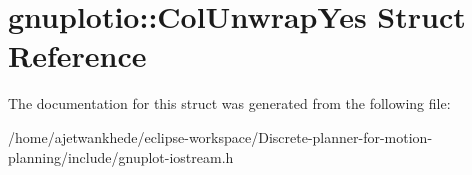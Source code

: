 \hypertarget{structgnuplotio_1_1ColUnwrapYes}{}\section{gnuplotio\+:\+:Col\+Unwrap\+Yes Struct Reference}
\label{structgnuplotio_1_1ColUnwrapYes}


The documentation for this struct was generated from the following file\+:\begin{DoxyCompactItemize}
\item 
/home/ajetwankhede/eclipse-\/workspace/\+Discrete-\/planner-\/for-\/motion-\/planning/include/gnuplot-\/iostream.\+h\end{DoxyCompactItemize}

